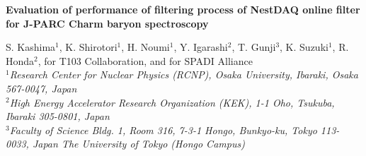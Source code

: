 \documentclass{snpyrs}
\begin{document}
%
\begin{center}
{\large \bf Evaluation of performance of filtering process of NestDAQ online filter for J-PARC Charm baryon spectroscopy}
\vspace*{0.3cm}

S. Kashima$^1$, K. Shirotori$^1$, H. Noumi$^1$, Y. Igarashi$^2$, T. Gunji$^3$, K.
Suzuki$^1$, R. Honda$^2$, for T103 Collaboration, and for SPADI Alliance\\

$^{1}${\it Research Center for Nuclear Physics (RCNP), Osaka University,
Ibaraki, Osaka 567-0047, Japan}\\
$^{2}${\it High Energy Accelerator Research Organization (KEK),
1-1 Oho, Tsukuba, Ibaraki 305-0801, Japan
}\\
$^{3}${\it Faculty of Science Bldg. 1, Room 316,
7-3-1 Hongo, Bunkyo-ku, Tokyo 113-0033, Japan
The University of Tokyo (Hongo Campus)
}\\
\end{center}

\vspace*{0.5cm}
%
%



\end{document}
